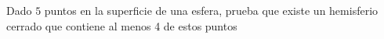 \begin{problem}
    [\cite{112CP}]
    Dado $5$ puntos en la superficie de una esfera, prueba que
    existe un hemisferio cerrado que contiene al menos 4
    de estos puntos
    \label{112CP154}
\end{problem}